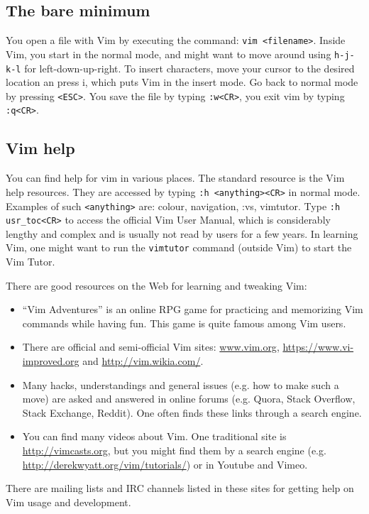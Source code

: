 \documentclass{article}
\begin{document}
\subsection{The bare minimum}\label{minimum}
You open a file with Vim by executing
the command: \texttt{vim <filename>}.
Inside Vim, you start in the normal
mode, and might want to move around using
\texttt{h-j-k-l} for left-down-up-right.
To insert characters, move your
cursor to the desired location an press i,
which puts Vim in the insert mode.
Go back to normal mode by pressing
\texttt{<ESC>}.
You save the file by typing \texttt{:w<CR>},
you exit vim by typing \texttt{:q<CR>}.

\subsection{Vim help}
You can find help for vim in various places.
The standard resource is the Vim help resources.
They are accessed by typing \texttt{:h <anything><CR>}
in normal mode.
Examples of such \texttt{<anything>} are:
colour, navigation, :vs, vimtutor.
Type 
\texttt{:h usr\_toc<CR>}
to access the official Vim User Manual,
which is considerably lengthy and complex
and is usually not read by users for a few years.
In learning Vim, one
might want to run the \texttt{vimtutor} command
(outside Vim) to start the Vim Tutor.

There are good resources on the Web for learning
and tweaking Vim:
\begin{itemize}
  \item ``Vim Adventures'' is an online RPG game for practicing
  and memorizing Vim commands while having fun.
  This game is quite famous among Vim users.
  \item There are official and semi-official Vim sites:
  \url{www.vim.org}, \url{https://www.vi-improved.org} and
  \url{http://vim.wikia.com/}.
  \item Many hacks, understandings and general issues
  (e.g. how to make such a move) are asked and answered
  in online forums (e.g. Quora, Stack Overflow, Stack Exchange, Reddit).
  One often finds these links through a search engine.
  \item You can find many videos about Vim.
  One traditional site is \url{http://vimcasts.org},
  but you might find them by a search engine (e.g. \url{http://derekwyatt.org/vim/tutorials/}) or in Youtube and Vimeo.
\end{itemize}

There are mailing lists and IRC channels listed in these
sites for getting help on Vim usage and development.
\end{document}

